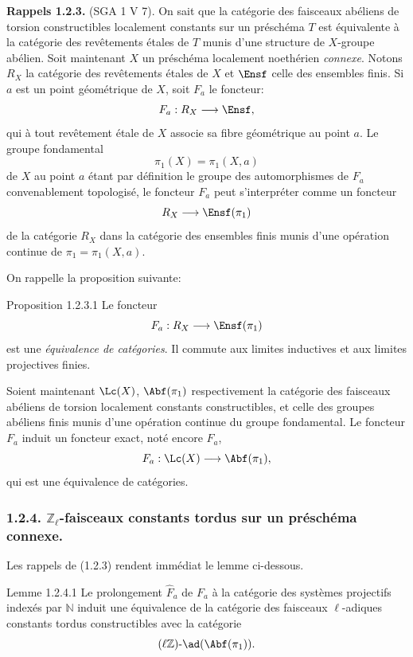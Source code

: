 \textbf{Rappels 1.2.3.} (SGA 1 V 7). On sait que la catégorie des faisceaux abéliens de torsion constructibles localement constants sur un préschéma \(T\) est équivalente à la catégorie des revêtements étales de \(T\) munis d'une structure de \(X\)-groupe abélien. Soit maintenant \(X\) un préschéma localement noethérien \emph{connexe}. Notons \(R_X\) la catégorie des revêtements étales de \(X\) et \(\Ensf\) celle des ensembles finis. Si \(a\) est un point géométrique de \(X\), soit \(F_a\) le foncteur:
\[
F_a:R_X\longrightarrow \Ensf,
\]
qui à
tout revêtement étale de \(X\) associe sa fibre géométrique au point \(a\). Le groupe fondamental
\[
\pi_1(X)=\pi_1(X,a)
\]
de \(X\) au point \(a\) étant par définition le groupe des automorphismes de \(F_a\) convenablement topologisé, le foncteur \(F_a\) peut s'interpréter comme un foncteur
\[
R_X\longrightarrow \Ensf(\pi_1)
\]
de la catégorie \(R_X\) dans la catégorie des ensembles finis munis d'une opération continue de \(\pi_1=\pi_1(X,a)\).

On rappelle la proposition suivante:

\begin{statement}{Proposition 1.2.3.1}
Le foncteur
\[
F_a:R_X\longrightarrow \Ensf(\pi_1)
\]
est une \emph{équivalence de catégories}. Il commute aux limites inductives et aux limites projectives finies.
\end{statement}

Soient maintenant \(\Lc(X)\), \(\Abf(\pi_1)\) respectivement la catégorie des faisceaux abéliens de torsion localement constants constructibles, et celle des groupes abéliens finis munis d'une opération continue du groupe fondamental. Le foncteur \(F_a\) induit un foncteur exact, noté encore \(F_a\),
\[
F_a:\Lc(X)\longrightarrow \Abf(\pi_1),
\]
qui est une équivalence de catégories.

\subsubsection*{1.2.4. \(\mathbb{Z}_\ell\)-faisceaux constants tordus sur un préschéma connexe.}

Les rappels de (1.2.3) rendent immédiat le lemme ci-dessous.

\begin{statement}{Lemme 1.2.4.1}
Le prolongement \(\widehat F_a\) de \(F_a\) à la catégorie des systèmes projectifs indexés par \(\mathbb{N}\) induit une équivalence de la catégorie des faisceaux \(\ell\)-adiques constants tordus constructibles avec la catégorie
\[
(\ell\mathbb{Z})\text{-}\ad(\Abf(\pi_1)).
\]
\end{statement}

